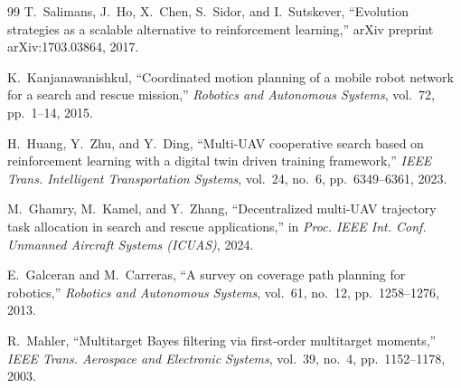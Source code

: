 \documentclass[conference]{IEEEtran}
\begin{document}
\begin{thebibliography}{99}
T.~Salimans, J.~Ho, X.~Chen, S.~Sidor, and I.~Sutskever,
``Evolution strategies as a scalable alternative to reinforcement learning,''
arXiv preprint arXiv:1703.03864, 2017.

K.~Kanjanawanishkul,
``Coordinated motion planning of a mobile robot network for a search and rescue mission,''
\emph{Robotics and Autonomous Systems}, vol.~72, pp.~1--14, 2015.

H.~Huang, Y.~Zhu, and Y.~Ding,
``Multi-UAV cooperative search based on reinforcement learning with a digital twin driven training framework,''
\emph{IEEE Trans. Intelligent Transportation Systems}, vol.~24, no.~6, pp.~6349--6361, 2023.

M.~Ghamry, M.~Kamel, and Y.~Zhang,
``Decentralized multi-UAV trajectory task allocation in search and rescue applications,''
in \emph{Proc. IEEE Int. Conf. Unmanned Aircraft Systems (ICUAS)}, 2024.

E.~Galceran and M.~Carreras,
``A survey on coverage path planning for robotics,''
\emph{Robotics and Autonomous Systems}, vol.~61, no.~12, pp.~1258--1276, 2013.

R.~Mahler,
``Multitarget Bayes filtering via first-order multitarget moments,''
\emph{IEEE Trans. Aerospace and Electronic Systems}, vol.~39, no.~4, pp.~1152--1178, 2003.

\end{thebibliography}
\end{document}
